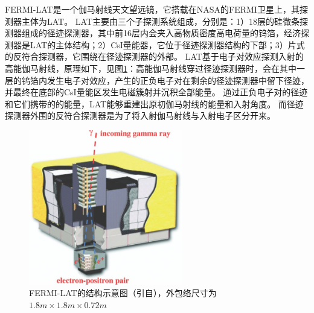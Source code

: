 FERMI-LAT是一个伽马射线天文望远镜，它搭载在NASA的FERMI卫星上，其探测器主体为LAT。
LAT主要由三个子探测系统组成，分别是：1）18层的硅微条探测器组成的径迹探测器，其中前16层内会夹入高物质密度高电荷量的钨箔，经济探测器是LAT的主体结构；2）CsI量能器，它位于径迹探测器结构的下部；3）片式的反符合探测器，它围绕在径迹探测器的外部。
LAT基于电子对效应探测入射的高能伽马射线，原理如下，见图\ref{fig:introduction:fermi_lat}：高能伽马射线穿过径迹探测器时，会在其中一层的钨箔内发生电子对效应，产生的正负电子对在剩余的径迹探测器中留下径迹，并最终在底部的CsI量能区发生电磁簇射并沉积全部能量。
通过正负电子对的径迹和它们携带的的能量，LAT能够重建出原初伽马射线的能量和入射角度。
而径迹探测器外围的反符合探测器是为了将入射伽马射线与入射电子区分开来。
\begin{figure}[htbp]
	\centering
	\includegraphics[width=0.6\textwidth]{chap/introduction/fig/fermi_lat.jpg}
	\caption{FERMI-LAT的结构示意图（引自\parencite{glast}），外包络尺寸为$1.8m \times 1.8m \times 0.72m$}
	\label{fig:introduction:fermi_lat}
\end{figure}



